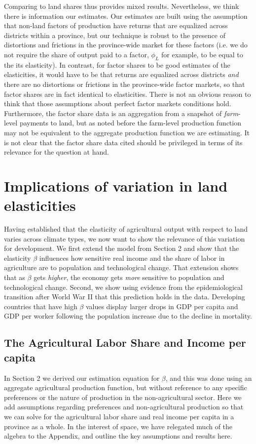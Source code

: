 \documentclass[11pt]{article}
\begin{document}
Comparing to land shares thus provides mixed results. Nevertheless, we think there is information our estimates. Our estimates are built using the assumption that non-land factors of production have returns that are equalized across districts within a province, but our technique is robust to the presence of distortions and frictions in the province-wide market for these factors (i.e. we do not require the share of output paid to a factor, $\phi_L$ for example, to be equal to the its elasticity). In contrast, for factor shares to be good estimates of the elasticities, it would have to be that returns are equalized across districts \textit{and} there are no distortions or frictions in the province-wide factor markets, so that factor shares are in fact identical to elasticities. There is not an obvious reason to think that those assumptions about perfect factor markets conditions hold. Furthermore, the factor share data is an aggregation from a snapshot of \textit{farm}-level payments to land, but as noted before the farm-level production function may not be equivalent to the aggregate production function we are estimating. It is not clear that the factor share data cited should be privileged in terms of its relevance for the question at hand.

\section{Implications of variation in land elasticities}\label{SEC_implications}
Having established that the elasticity of agricultural output with respect to land varies across climate types, we now want to show the relevance of this variation for development. We first extend the model from Section 2 and show that the elasticity $\beta$ influences how sensitive real income and the share of labor in agriculture are to population and technological change. That extension shows that as $\beta$ gets \textit{higher}, the economy gets \textit{more} sensitive to population and technological change. Second, we show using evidence from the epidemiological transition after World War II that this prediction holds in the data. Developing countries that have high $\beta$ values display larger drops in GDP per capita and GDP per worker following the population increase due to the decline in mortality.

\subsection{The Agricultural Labor Share and Income per capita}
In Section 2 we derived our estimation equation for $\beta$, and this was done using an aggregate agricultural production function, but without reference to any specific preferences or the nature of production in the non-agricultural sector. Here we add assumptions regarding preferences and non-agricultural production so that we can solve for the agricultural labor share and real income per capita in a province as a whole. In the interest of space, we have relegated much of the algebra to the Appendix, and outline the key assumptions and results here. 
\end{document}
